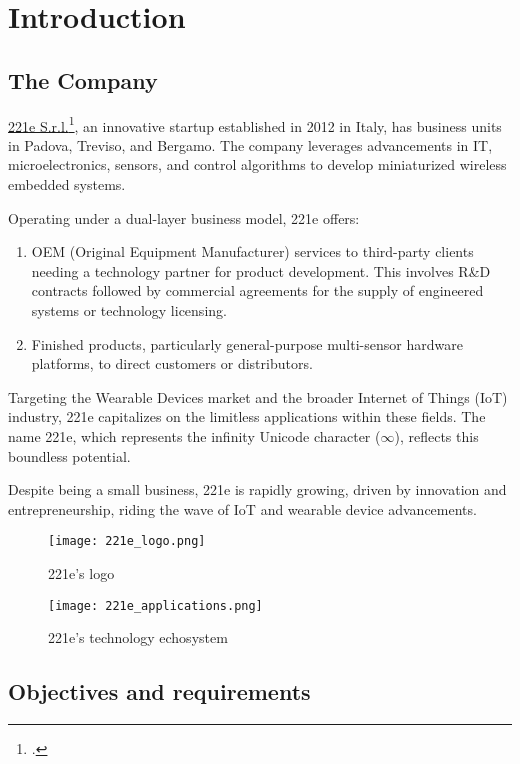 \chapter{Introduction}
\label{cap:introduction}

\section{The Company}
\href{https://www.221e.com/about-us}{221e S.r.l.}\footcite{site:221e}, an innovative startup established in 2012 in Italy, has business units in Padova, Treviso, and Bergamo. The company leverages advancements in IT, microelectronics, sensors, and control algorithms to develop miniaturized wireless embedded systems.

Operating under a dual-layer business model, 221e offers:
\begin{enumerate}
    \item OEM (Original Equipment Manufacturer) services to third-party clients needing a technology partner for product development. This involves R\&D contracts followed by commercial agreements for the supply of engineered systems or technology licensing.
    \item Finished products, particularly general-purpose multi-sensor hardware platforms, to direct customers or distributors.
\end{enumerate}

Targeting the Wearable Devices market and the broader Internet of Things (IoT) industry, 221e capitalizes on the limitless applications within these fields. The name 221e, which represents the infinity Unicode character (\(\infty\)), reflects this boundless potential.

Despite being a small business, 221e is rapidly growing, driven by innovation and entrepreneurship, riding the wave of IoT and wearable device advancements.

\begin{figure}[htbp]
    \centering
    \texttt{[image: 221e\_logo.png]}
    \caption{221e's logo}
\end{figure}

\begin{figure}[htbp]
    \centering
    \texttt{[image: 221e\_applications.png]}
    \caption{221e's technology echosystem}
\end{figure}


\newpage
\section{Objectives and requirements}

